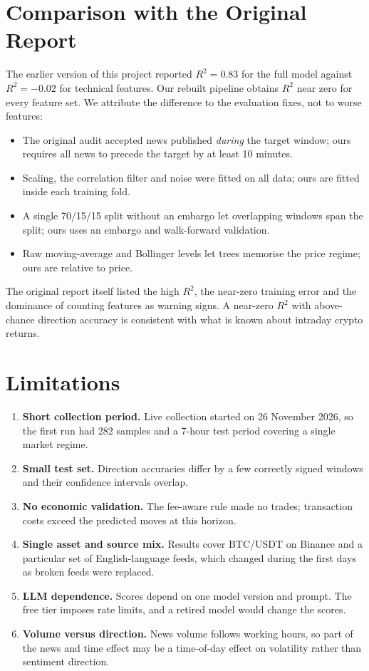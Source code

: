 \documentclass[12pt,a4paper,oneside]{report}
\newcommand{\prelim}[1]{\colorbox{yellow!40}{#1}}
\newcommand{\prelim}[1]{#1}
\begin{document}
\section{Comparison with the Original Report}
The earlier version of this project reported $R^2 = 0.83$ for the full model
against $R^2 = -0.02$ for technical features. Our rebuilt pipeline obtains
$R^2$ near zero for every feature set. We attribute the difference to the
evaluation fixes, not to worse features:
\begin{itemize}
  \item The original audit accepted news published \emph{during} the target
        window; ours requires all news to precede the target by at least 10
        minutes.
  \item Scaling, the correlation filter and noise were fitted on all data; ours
        are fitted inside each training fold.
  \item A single 70/15/15 split without an embargo let overlapping windows
        span the split; ours uses an embargo and walk-forward validation.
  \item Raw moving-average and Bollinger levels let trees memorise the price
        regime; ours are relative to price.
\end{itemize}
The original report itself listed the high $R^2$, the near-zero training
error and the dominance of counting features as warning signs. A near-zero
$R^2$ with above-chance direction accuracy is consistent with what is known
about intraday crypto returns.

\section{Limitations}\label{sec:limitations}
\begin{enumerate}
  \item \textbf{Short collection period.} Live collection started on 26
        November 2026, so the first run had \prelim{282} samples and a
        \prelim{7-hour} test period covering a single market regime.
  \item \textbf{Small test set.} Direction accuracies differ by a few
        correctly signed windows and their confidence intervals overlap.
  \item \textbf{No economic validation.} The fee-aware rule made no trades;
        transaction costs exceed the predicted moves at this horizon.
  \item \textbf{Single asset and source mix.} Results cover BTC/USDT on Binance
        and a particular set of English-language feeds, which changed during
        the first days as broken feeds were replaced.
  \item \textbf{LLM dependence.} Scores depend on one model version and prompt.
        The free tier imposes rate limits, and a retired model would change the
        scores.
  \item \textbf{Volume versus direction.} News volume follows working hours,
        so part of the news and time effect may be a time-of-day effect on
        volatility rather than sentiment direction.
\end{enumerate}
\end{document}
